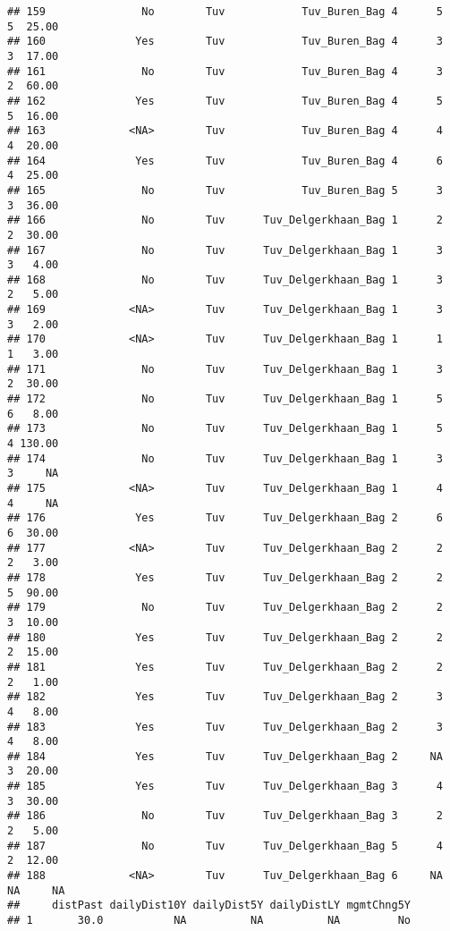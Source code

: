 \documentclass[
]{article}
\begin{document}
\begin{verbatim}
## 159               No        Tuv            Tuv_Buren_Bag 4      5      5  25.00
## 160              Yes        Tuv            Tuv_Buren_Bag 4      3      3  17.00
## 161               No        Tuv            Tuv_Buren_Bag 4      3      2  60.00
## 162              Yes        Tuv            Tuv_Buren_Bag 4      5      5  16.00
## 163             <NA>        Tuv            Tuv_Buren_Bag 4      4      4  20.00
## 164              Yes        Tuv            Tuv_Buren_Bag 4      6      4  25.00
## 165               No        Tuv            Tuv_Buren_Bag 5      3      3  36.00
## 166               No        Tuv      Tuv_Delgerkhaan_Bag 1      2      2  30.00
## 167               No        Tuv      Tuv_Delgerkhaan_Bag 1      3      3   4.00
## 168               No        Tuv      Tuv_Delgerkhaan_Bag 1      3      2   5.00
## 169             <NA>        Tuv      Tuv_Delgerkhaan_Bag 1      3      3   2.00
## 170             <NA>        Tuv      Tuv_Delgerkhaan_Bag 1      1      1   3.00
## 171               No        Tuv      Tuv_Delgerkhaan_Bag 1      3      2  30.00
## 172               No        Tuv      Tuv_Delgerkhaan_Bag 1      5      6   8.00
## 173               No        Tuv      Tuv_Delgerkhaan_Bag 1      5      4 130.00
## 174               No        Tuv      Tuv_Delgerkhaan_Bag 1      3      3     NA
## 175             <NA>        Tuv      Tuv_Delgerkhaan_Bag 1      4      4     NA
## 176              Yes        Tuv      Tuv_Delgerkhaan_Bag 2      6      6  30.00
## 177             <NA>        Tuv      Tuv_Delgerkhaan_Bag 2      2      2   3.00
## 178              Yes        Tuv      Tuv_Delgerkhaan_Bag 2      2      5  90.00
## 179               No        Tuv      Tuv_Delgerkhaan_Bag 2      2      3  10.00
## 180              Yes        Tuv      Tuv_Delgerkhaan_Bag 2      2      2  15.00
## 181              Yes        Tuv      Tuv_Delgerkhaan_Bag 2      2      2   1.00
## 182              Yes        Tuv      Tuv_Delgerkhaan_Bag 2      3      4   8.00
## 183              Yes        Tuv      Tuv_Delgerkhaan_Bag 2      3      4   8.00
## 184              Yes        Tuv      Tuv_Delgerkhaan_Bag 2     NA      3  20.00
## 185              Yes        Tuv      Tuv_Delgerkhaan_Bag 3      4      3  30.00
## 186               No        Tuv      Tuv_Delgerkhaan_Bag 3      2      2   5.00
## 187               No        Tuv      Tuv_Delgerkhaan_Bag 5      4      2  12.00
## 188             <NA>        Tuv      Tuv_Delgerkhaan_Bag 6     NA     NA     NA
##     distPast dailyDist10Y dailyDist5Y dailyDistLY mgmtChng5Y
## 1       30.0           NA          NA          NA         No

\end{verbatim}
\end{document}
